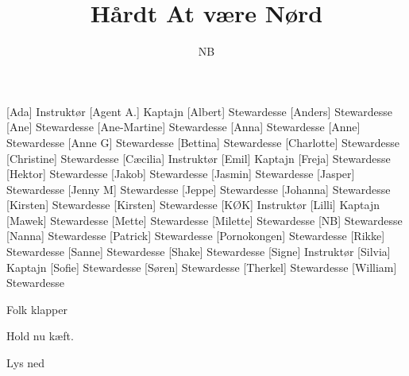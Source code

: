 \documentclass[a4paper,11pt]{article}
\title{Hårdt At være Nørd}
\author{NB}
\begin{document}
\maketitle

\begin{roles}
[Ada] Instruktør
[Agent A.] Kaptajn
[Albert] Stewardesse
[Anders] Stewardesse
[Ane] Stewardesse
[Ane-Martine] Stewardesse
[Anna] Stewardesse
[Anne] Stewardesse
[Anne G] Stewardesse
[Bettina] Stewardesse
[Charlotte] Stewardesse
[Christine] Stewardesse
[Cæcilia] Instruktør
[Emil] Kaptajn
[Freja] Stewardesse
[Hektor] Stewardesse
[Jakob] Stewardesse
[Jasmin] Stewardesse
[Jasper] Stewardesse
[Jenny M] Stewardesse
[Jeppe] Stewardesse
[Johanna] Stewardesse
[Kirsten] Stewardesse
[Kirsten] Stewardesse
[KØK] Instruktør
[Lilli] Kaptajn
[Mawek] Stewardesse
[Mette] Stewardesse
[Milette] Stewardesse
[NB] Stewardesse
[Nanna] Stewardesse
[Patrick] Stewardesse
[Pornokongen] Stewardesse
[Rikke] Stewardesse
[Sanne] Stewardesse
[Shake] Stewardesse
[Signe] Instruktør
[Silvia] Kaptajn
[Sofie] Stewardesse
[Søren] Stewardesse
[Therkel] Stewardesse
[William] Stewardesse
\end{roles}


\begin{sketch}
\scene Folk klapper

 Hold nu kæft.

\scene Lys ned
\end{sketch}
\end{document}
